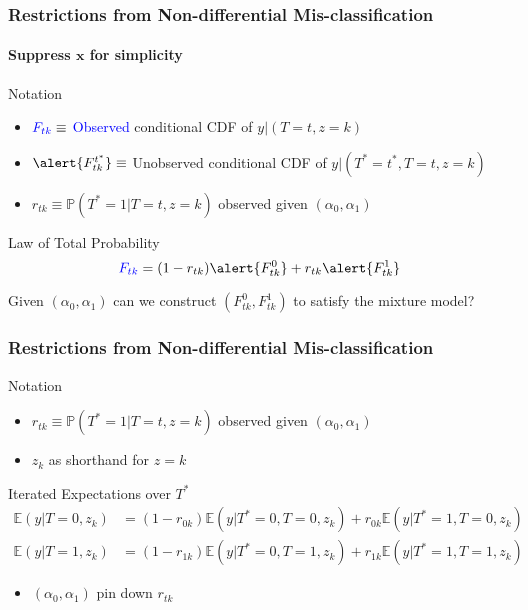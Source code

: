 \documentclass{beamer}
\begin{document}
\begin{frame}[plain,label=SHARP_APPEND]
  \frametitle{Restrictions from Non-differential Mis-classification}
  \framesubtitle{Suppress $\mathbf{x}$ for simplicity}

  \small
  \begin{block}{Notation}
    \begin{itemize}
      \item $\textcolor{blue}{F_{tk}} \equiv$ \textcolor{blue}{Observed} conditional CDF of $y|(T=t,z=k)$
      \item $\alert{F^{t^*}_{tk}} \equiv$ \alert{Unobserved} conditional CDF of $y|(T^*=t^*,T=t,z=k)$
      \item $r_{tk} \equiv \mathbb{P}(T^*=1|T=t,z=k)$ observed given $(\alpha_0, \alpha_1)$
    \end{itemize}
  \end{block}

  \begin{block}{Law of Total Probability}
    \vspace{-1em}
  \[
    \textcolor{blue}{F_{tk}} = (1 - r_{tk}) \alert{F^{0}_{tk}} + r_{tk}\alert{F^{1}_{tk}}
  \]
  \end{block}

  Given $(\alpha_0, \alpha_1)$ can we construct  $(F_{tk}^0, F_{tk}^1)$ to satisfy the mixture model?

\end{frame}
\begin{frame}[plain,t]
  \frametitle{Restrictions from Non-differential Mis-classification}

  \footnotesize

  \begin{block}{Notation}
    \begin{itemize}
      \item $r_{tk} \equiv \mathbb{P}(T^*=1|T=t,z=k)$ observed given $(\alpha_0, \alpha_1)$ 
      \item $z_k$ as shorthand for $z =k$\\
    \end{itemize}
  \end{block}

  \begin{block}{Iterated Expectations over $T^*$}
    \vspace{-1em}
  \begin{align*}
    \mathbb{E}(y|T=0,z_k) &= (1 - r_{0k})\mathbb{E}(y|T^*=0,T=0,z_k) + r_{0k}\mathbb{E}(y|T^*=1,T=0,z_k)\\
    \mathbb{E}(y|T=1,z_k) &= (1 - r_{1k}) \mathbb{E}(y|T^*=0,T=1,z_k) + r_{1k}\mathbb{E}(y|T^*=1,T=1,z_k)
  \end{align*}
  \end{block}

  \vspace{1em}

  \begin{itemize}
    \item $(\alpha_0, \alpha_1)$ pin down $r_{tk}$
  \end{itemize}

\end{frame}
\end{document}
